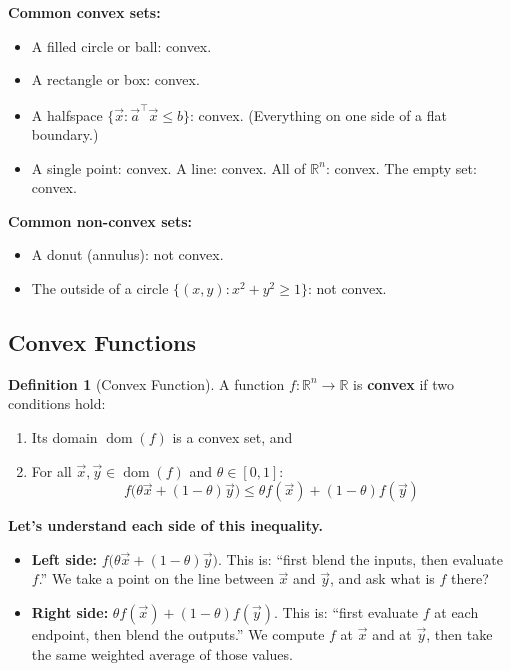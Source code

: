 \documentclass[10pt]{article}
\theoremstyle{definition}
\newtheorem{definition}{Definition}
\theoremstyle{plain}
\newcommand{\RR}{\mathbb{R}}
\DeclareMathOperator{\dom}{dom}
\begin{document}
\begin{result}
\textbf{Common convex sets:}
\begin{itemize}
    \item A filled circle or ball: convex.
    \item A rectangle or box: convex.
    \item A halfspace $\{\vec{x} : \vec{a}^\top \vec{x} \le b\}$: convex. (Everything on one side of a flat boundary.)
    \item A single point: convex. A line: convex. All of $\RR^n$: convex. The empty set: convex.
\end{itemize}
\textbf{Common non-convex sets:}
\begin{itemize}
    \item A donut (annulus): not convex.
    \item The outside of a circle $\{(x,y) : x^2 + y^2 \ge 1\}$: not convex.
\end{itemize}
\end{result}

\subsection{Convex Functions}

\begin{definition}[Convex Function]
A function $f : \RR^n \to \RR$ is \textbf{convex} if two conditions hold:
\begin{enumerate}
    \item Its domain $\dom(f)$ is a convex set, and
    \item For all $\vec{x}, \vec{y} \in \dom(f)$ and $\theta \in [0,1]$:
    \[
        f\big(\theta \vec{x} + (1-\theta)\vec{y}\big) \le \theta f(\vec{x}) + (1-\theta)f(\vec{y})
    \]
\end{enumerate}
\end{definition}

\textbf{Let's understand each side of this inequality.}

\begin{itemize}
    \item \textbf{Left side:} $f\big(\theta \vec{x} + (1-\theta)\vec{y}\big)$. This is: ``first blend the inputs, then evaluate $f$.'' We take a point on the line between $\vec{x}$ and $\vec{y}$, and ask what is $f$ there?

    \item \textbf{Right side:} $\theta f(\vec{x}) + (1-\theta) f(\vec{y})$. This is: ``first evaluate $f$ at each endpoint, then blend the outputs.'' We compute $f$ at $\vec{x}$ and at $\vec{y}$, then take the same weighted average of those values.
\end{itemize}
\end{document}
